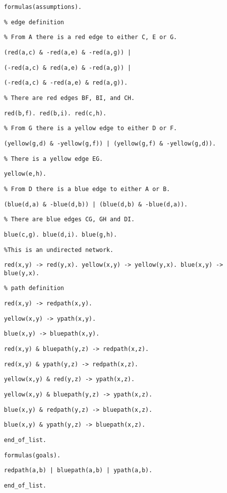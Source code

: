 {\footnotesize

{\tt formulas(assumptions).}

{\tt \% edge definition }

{\tt \% From A there is a red edge to either C, E or G. }

{\tt (red(a,c) \& -red(a,e) \& -red(a,g)) | }

{\tt (-red(a,c) \& red(a,e) \& -red(a,g)) | }

{\tt (-red(a,c) \& -red(a,e) \& red(a,g)). }

{\tt \% There are red edges BF, BI, and CH. }

{\tt red(b,f). red(b,i). red(c,h).}

{\tt \% From G there is a yellow edge to either D or F.}

{\tt (yellow(g,d) \& -yellow(g,f)) | (yellow(g,f) \& -yellow(g,d)). }

{\tt \% There is a yellow edge EG.}

{\tt yellow(e,h).}

{\tt \% From D there is a blue edge to either A or B.}

{\tt (blue(d,a) \& -blue(d,b)) | (blue(d,b) \& -blue(d,a)).}

{\tt \% There are blue edges CG, GH and DI. }

{\tt blue(c,g). blue(d,i). blue(g,h).}

{\tt \%This is an undirected network.}

{\tt red(x,y) -> red(y,x). yellow(x,y) -> yellow(y,x). blue(x,y) -> blue(y,x).}

{\tt \% path definition}

{\tt red(x,y) -> redpath(x,y).}

{\tt yellow(x,y) -> ypath(x,y).}

{\tt blue(x,y) -> bluepath(x,y).}

{\tt red(x,y) \& bluepath(y,z) -> redpath(x,z).}

{\tt red(x,y) \& ypath(y,z) -> redpath(x,z).}

{\tt yellow(x,y) \& red(y,z) -> ypath(x,z).}

{\tt yellow(x,y) \& bluepath(y,z) -> ypath(x,z).}

{\tt blue(x,y) \& redpath(y,z) -> bluepath(x,z).}

{\tt blue(x,y) \& ypath(y,z) -> bluepath(x,z).}

{\tt end\_of\_list.}

{\tt formulas(goals).}

{\tt redpath(a,b) | bluepath(a,b) | ypath(a,b).}

{\tt end\_of\_list.}

}


